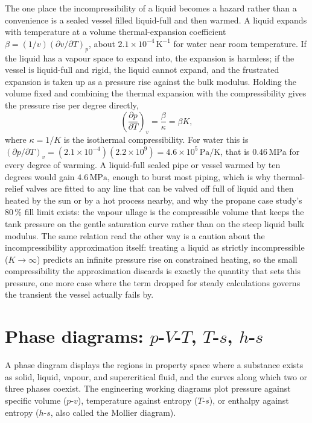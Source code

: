 The one place the incompressibility of a liquid becomes a hazard rather than
a convenience is a sealed vessel filled liquid-full and then warmed. A liquid
expands with temperature at a volume thermal-expansion coefficient $\beta =
(1/v)(\partial v/\partial T)_p$, about $2.1\times 10^{-4}\,\si{\kelvin}^{-1}$
for water near room temperature. If the liquid has a vapour space to expand
into, the expansion is harmless; if the vessel is liquid-full and rigid, the
liquid cannot expand, and the frustrated expansion is taken up as a pressure
rise against the bulk modulus. Holding the volume fixed and combining the
thermal expansion with the compressibility gives the pressure rise per degree
directly,
\[
\left(\frac{\partial p}{\partial T}\right)_v = \frac{\beta}{\kappa} = \beta
K,
\]
where $\kappa = 1/K$ is the isothermal compressibility. For water this is
$(\partial p/\partial T)_v = (2.1\times 10^{-4})(2.2\times 10^9) = 4.6\times
10^5\,\text{Pa}/\si{\kelvin}$, that is $0.46\,\text{MPa}$ for every degree of
warming. A liquid-full sealed pipe or vessel warmed by ten degrees would gain
$4.6\,\text{MPa}$, enough to burst most piping, which is why thermal-relief
valves are fitted to any line that can be valved off full of liquid and then
heated by the sun or by a hot process nearby, and why the propane case
study's $80\,\%$ fill limit exists: the vapour ullage is the compressible
volume that keeps the tank pressure on the gentle saturation curve rather
than on the steep liquid bulk modulus. The same relation read the other way
is a caution about the incompressibility approximation itself: treating a
liquid as strictly incompressible ($K\to\infty$) predicts an infinite
pressure rise on constrained heating, so the small compressibility the
approximation discards is exactly the quantity that sets this pressure, one
more case where the term dropped for steady calculations governs the
transient the vessel actually fails by.

\section{Phase diagrams: $p$-$V$-$T$, $T$-$s$, $h$-$s$}

A phase diagram displays the regions in property space where a
substance exists as solid, liquid, vapour, and supercritical fluid,
and the curves along which two or three phases coexist. The
engineering working diagrams plot pressure against specific volume
($p$-$v$), temperature against entropy ($T$-$s$), or enthalpy against
entropy ($h$-$s$, also called the Mollier diagram).

